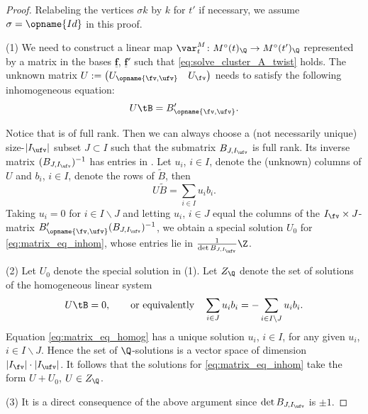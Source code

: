 \documentclass[pdftex]{sigma}
\newcommand{\Mc}{M^\circ}
\newcommand{\Iufv}{I_{\ufv}}
\newcommand{\Id}{{\opname{Id}}}
\newcommand{\ff}{\mathbf{f}}
\newcommand{\uff}{\underline{\ff}}
\newcommand{\low}{\opname{\fv,\ufv}}
\numberwithin{equation}{section}
\begin{document}
\begin{proof}
Relabeling the vertices $\sigma k$ by $k$ for $t'$ if necessary,
we assume $\sigma=\Id$ in this proof.

(1) We need to construct a linear map $\var_{t}^{M}\colon\Mc(t)_{\Q}\rightarrow\Mc(t')_{\Q}$
represented by a matrix \smash{$\left(\begin{smallmatrix}
\Id_{\ufv} & 0\\
U_{\low} & U_{\fv}
\end{smallmatrix}\right)$} in the bases $\uff$, $\uff'$ such that \eqref{eq:solve_cluster_A_twist}
holds. The unknown matrix $U:=\begin{pmatrix}
U_{\low} & U_{\fv}\end{pmatrix}$ needs to satisfy the following inhomogeneous equation:
\begin{gather}
U\tB = B'_{\low} \label{eq:matrix_eq_inhom}.
\end{gather}

Notice that \smash{$\tB=\left(\begin{smallmatrix}
B_{\ufv}\\
B_{\low}
\end{smallmatrix}\right)$} is of full rank. Then we can always choose a (not necessarily unique)
size-$|\Iufv|$ subset $J\subset I$ such that the submatrix $B_{J,\Iufv}$
is full rank. Its inverse matrix $(B_{J,\Iufv})^{-1}$ has entries
in
\smash{$\frac{1}{\det B_{J,\Iufv}}\Z$}.
Let $u_i$, $i\in I$, denote the (unknown) columns of $U$ and $b_i$, $i\in I$, denote the rows of $\tilde{B}$, then
\[U\tilde{B}=\sum_{i\in I}u_ib_i.\]
Taking $u_i=0$ for $i\in I\backslash J$ and letting $u_i$, $i\in J$ equal the columns of the $I_{\fv}\times J$-matrix $B'_{\low}(B_{J,\Iufv})^{-1}$, we obtain a special solution $U_0$ for \eqref{eq:matrix_eq_inhom}, whose entries lie in $\frac{1}{\det B_{J,\Iufv}}\Z$.

(2) Let $U_{0}$ denote the special solution in (1). Let $Z_{\Q}$ denote
the set of solutions of the homogeneous linear system
\begin{gather}\label{eq:matrix_eq_homog}
U\tB=0, \qquad \text{or equivalently}\quad\sum_{i\in J}u_ib_i=-\sum_{i\in I\setminus J}u_ib_i.
\end{gather}
Equation \eqref{eq:matrix_eq_homog} has a unique solution $u_i$, $i\in I$, for any given $u_i$, $i\in I\backslash J$. Hence the set of $\Q$-solutions is a vector space of dimension $|I_{\fv}|\cdot|\Iufv|$.
It follows that the solutions for \eqref{eq:matrix_eq_inhom} take
the form $U+U_{0}$, $U\in Z_{\Q}$.

(3) It is a direct consequence of the above argument since $\det B_{J,\Iufv}$ is $\pm 1$.
\end{proof}
\end{document}
